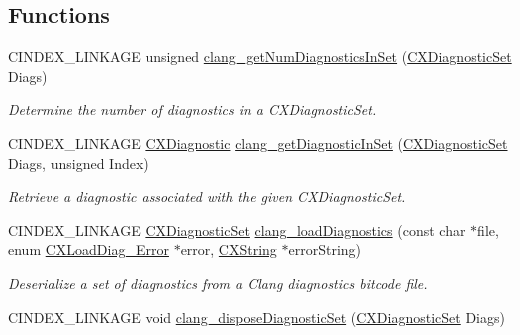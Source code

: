 \subsection*{Functions}
\begin{DoxyCompactItemize}
\item 
\mbox{\label{group__CINDEX__DIAG_ga44e87e54125e501de0d3bd29161fe26b}} 
C\+I\+N\+D\+E\+X\+\_\+\+L\+I\+N\+K\+A\+GE unsigned \mbox{\hyperlink{group__CINDEX__DIAG_ga44e87e54125e501de0d3bd29161fe26b}{clang\+\_\+get\+Num\+Diagnostics\+In\+Set}} (\mbox{\hyperlink{group__CINDEX__DIAG_ga38dfc0ae45b55bf7fd577eed9148e244}{C\+X\+Diagnostic\+Set}} Diags)
\begin{DoxyCompactList}\small\item\em Determine the number of diagnostics in a C\+X\+Diagnostic\+Set. \end{DoxyCompactList}\item 
C\+I\+N\+D\+E\+X\+\_\+\+L\+I\+N\+K\+A\+GE \mbox{\hyperlink{group__CINDEX__DIAG_ga44bb8aba7c40590ad25d1763c4fbff7f}{C\+X\+Diagnostic}} \mbox{\hyperlink{group__CINDEX__DIAG_ga997e07d587e02eea7d29874c33c94249}{clang\+\_\+get\+Diagnostic\+In\+Set}} (\mbox{\hyperlink{group__CINDEX__DIAG_ga38dfc0ae45b55bf7fd577eed9148e244}{C\+X\+Diagnostic\+Set}} Diags, unsigned Index)
\begin{DoxyCompactList}\small\item\em Retrieve a diagnostic associated with the given C\+X\+Diagnostic\+Set. \end{DoxyCompactList}\item 
C\+I\+N\+D\+E\+X\+\_\+\+L\+I\+N\+K\+A\+GE \mbox{\hyperlink{group__CINDEX__DIAG_ga38dfc0ae45b55bf7fd577eed9148e244}{C\+X\+Diagnostic\+Set}} \mbox{\hyperlink{group__CINDEX__DIAG_gaa1e3aff15dc2eb97330533f0c68bd28f}{clang\+\_\+load\+Diagnostics}} (const char $\ast$file, enum \mbox{\hyperlink{group__CINDEX__DIAG_gafccf4d49329805ac24e6dc005aafc848}{C\+X\+Load\+Diag\+\_\+\+Error}} $\ast$error, \mbox{\hyperlink{structCXString}{C\+X\+String}} $\ast$error\+String)
\begin{DoxyCompactList}\small\item\em Deserialize a set of diagnostics from a Clang diagnostics bitcode file. \end{DoxyCompactList}\item 
\mbox{\label{group__CINDEX__DIAG_ga1a1126b07e4dc0b45b0617f3cc848d57}} 
C\+I\+N\+D\+E\+X\+\_\+\+L\+I\+N\+K\+A\+GE void \mbox{\hyperlink{group__CINDEX__DIAG_ga1a1126b07e4dc0b45b0617f3cc848d57}{clang\+\_\+dispose\+Diagnostic\+Set}} (\mbox{\hyperlink{group__CINDEX__DIAG_ga38dfc0ae45b55bf7fd577eed9148e244}{C\+X\+Diagnostic\+Set}} Diags)

\end{DoxyCompactItemize}
